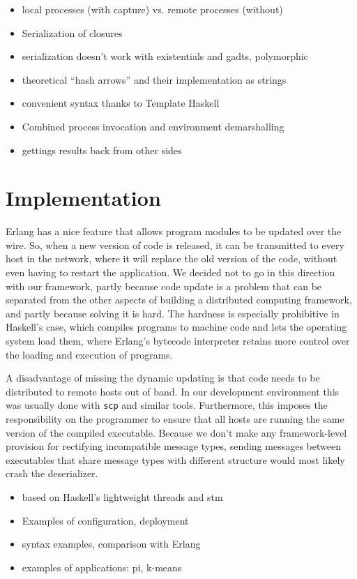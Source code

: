 \documentclass[preprint]{sigplanconf}
\begin{document}
\begin{itemize}
\item local processes (with capture) vs. remote processes (without)
\item Serialization of closures
\item serialization doesn't work with existentials and gadts, polymorphic
\item theoretical ``hash arrows'' and their implementation as strings
\item convenient syntax thanks to Template Haskell
\item Combined process invocation and environment demarshalling
\item gettings results back from other sides
\end{itemize}


\section{Implementation}
Erlang has a nice feature that allows program modules to be updated over the wire. So, when a new version of code is released, it can be transmitted to every host in the network, where it will replace the old version of the code, without even having to restart the application. We decided not to go in this direction with our framework, partly because code update is a problem that can be separated from the other aspects of building a distributed computing framework, and partly because solving it is hard. The hardness is especially prohibitive in Haskell's case, which compiles programs to machine code and lets the operating system load them, where Erlang's bytecode interpreter retains more control over the loading and execution of programs.

A disadvantage of missing the dynamic updating is that code needs to be distributed to remote hosts out of band. In our development environment this was usually done with \texttt{scp} and similar tools. Furthermore, this imposes the responsibility on the programmer to ensure that all hosts are running the same version of the compiled executable. Because we don't make any framework-level provision for rectifying incompatible message types, sending messages between executables that share message types with different structure would most likely crash the deserializer.

\begin{itemize}
\item based on Haskell's lightweight threads  and stm
\item Examples of configuration, deployment
\item syntax examples, comparison with Erlang
\item examples of applications: pi, k-means
\end{itemize}
\end{document}
